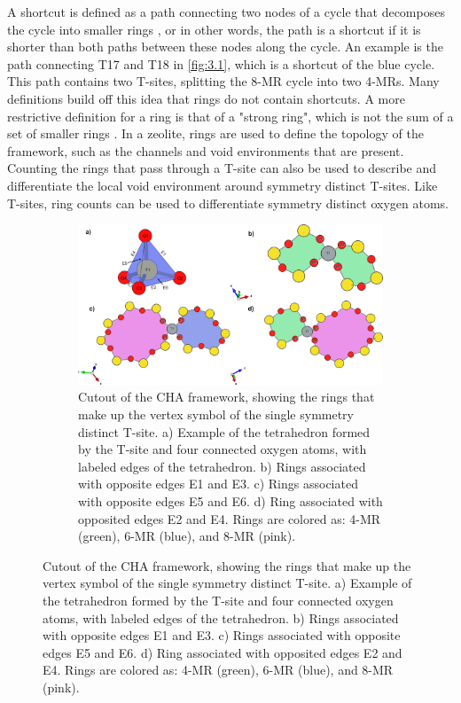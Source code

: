 \documentclass[preprint,numrefs,noinfo,sort&compress]{elsarticle}
\begin{document}
A shortcut is defined as a path connecting two nodes of a cycle that decomposes the cycle into smaller rings \cite{guttman-ring-1990,goetzke-properties-1991}, or in other words, the path is a shortcut if it is shorter than both paths between these nodes along the cycle. An example is the path connecting T17 and T18 in \cref{fig:3.1}, which is a shortcut of the blue cycle. This path contains two T-sites, splitting the 8-MR cycle into two 4-MRs. Many definitions build off this idea that rings do not contain shortcuts. A more restrictive definition for a ring is that of a "strong ring", which is not the sum of a set of smaller rings \cite{goetzke-properties-1991,blatov-three-periodic-2007}. In a zeolite, rings are used to define the topology of the framework, such as the channels and void environments that are present. Counting the rings that pass through a T-site can also be used to describe and differentiate the local void environment around symmetry distinct T-sites. Like T-sites, ring counts can be used to differentiate symmetry distinct oxygen atoms.

\begin{figure}
\begin{figure}[H]
\centering
\includegraphics[width=\textwidth]{figures/chapter-3/cha-vertex.pdf}
\caption{Cutout of the CHA framework, showing the rings that make up the vertex symbol of the single symmetry distinct T-site. a) Example of the tetrahedron formed by the T-site and four connected oxygen atoms, with labeled edges of the tetrahedron. b) Rings associated with opposite edges E1 and E3. c) Rings associated with opposite edges E5 and E6. d) Ring associated with opposited edges E2 and E4. Rings are colored as: 4-MR (green), 6-MR (blue), and 8-MR (pink). \label{fig:cha-vertex}}
\end{figure}
\end{figure}
\end{document}
